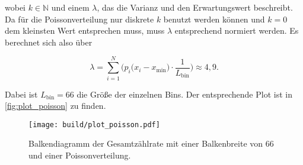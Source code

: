 wobei $k \in \mathds{N}$ und einem $\lambda$, das die Varianz und den Erwartungswert beschreibt. 
Da für die Poissonverteilung nur diskrete $k$ benutzt werden können und $k=0$ dem kleinsten Wert entsprechen muss,
muss $\lambda$ entsprechend normiert werden.
Es berechnet sich also über

\begin{equation}
    \lambda = \sum_{i=1}^{N} \bigg( p_i \bigg( x_i - x_\text{min} \bigg) \cdot \frac{1}{L_\text{bin}} \bigg) \approx 4,9.
\end{equation}

Dabei ist $L_\text{bin} = 66$ die Größe der einzelnen Bins.
Der entsprechende Plot ist in \autoref{fig:plot_poisson} zu finden.

\begin{figure}
    \centering
    \texttt{[image: build/plot\_poisson.pdf]}
    \caption{Balkendiagramm der Gesamtzählrate mit einer Balkenbreite von 66 und einer Poissonverteilung.}
    \label{fig:plot_poisson}
\end{figure}
